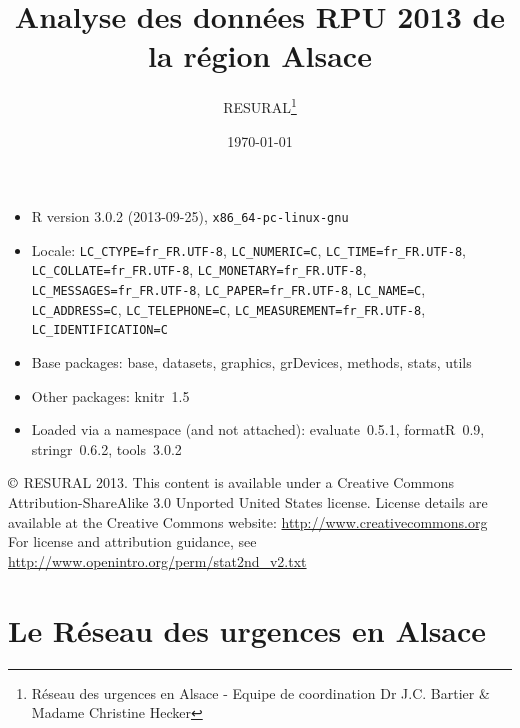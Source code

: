 \documentclass[12pt,english,french,twoside]{report}\usepackage[]{graphicx}\usepackage[]{color}
\begin{document}
\title{Analyse des données RPU 2013 de la région Alsace}
\author{RESURAL\thanks{Réseau des urgences en Alsace - Equipe de coordination Dr J.C.
Bartier \& Madame Christine Hecker}}
\date{\today}
\maketitle


\newpage
\chapter*{}
\vfill
\begin{itemize}\raggedright
  \item R version 3.0.2 (2013-09-25), \verb|x86_64-pc-linux-gnu|
  \item Locale: \verb|LC_CTYPE=fr_FR.UTF-8|, \verb|LC_NUMERIC=C|, \verb|LC_TIME=fr_FR.UTF-8|, \verb|LC_COLLATE=fr_FR.UTF-8|, \verb|LC_MONETARY=fr_FR.UTF-8|, \verb|LC_MESSAGES=fr_FR.UTF-8|, \verb|LC_PAPER=fr_FR.UTF-8|, \verb|LC_NAME=C|, \verb|LC_ADDRESS=C|, \verb|LC_TELEPHONE=C|, \verb|LC_MEASUREMENT=fr_FR.UTF-8|, \verb|LC_IDENTIFICATION=C|
  \item Base packages: base, datasets, graphics, grDevices,
    methods, stats, utils
  \item Other packages: knitr~1.5
  \item Loaded via a namespace (and not attached): evaluate~0.5.1,
    formatR~0.9, stringr~0.6.2, tools~3.0.2
\end{itemize}


\noindent $\copyright$ RESURAL 2013. This content is available under a Creative Commons Attribution-ShareAlike 3.0 Unported United States license. License details are available at the Creative Commons website: \url{http://www.creativecommons.org} \\

\noindent For license and attribution guidance, see \url{http://www.openintro.org/perm/stat2nd_v2.txt}


\tableofcontents
\listoftables
\listoffigures



\part{Le Réseau des urgences en Alsace}
\newpage
\end{document}
